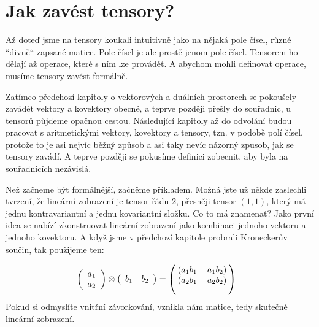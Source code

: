 \documentclass[a5paper,12pt]{amsbook}
\theoremstyle{definition}
\begin{document}
\section{Jak zavést tensory?}

\noindent
Až doteď jsme na tensory koukali intuitivně jako na nějaká pole čísel, různé ``divně`` zapsané matice.
Pole čísel je ale prostě jenom pole čísel. Tensorem ho dělají až operace, které s ním lze provádět.
A abychom mohli definovat operace, musíme tensory zavést formálně.

Zatímco předchozí kapitoly o vektorových a duálních prostorech se pokoušely zavádět vektory
a kovektory obecně, a teprve později přešly do souřadnic, u tensorů půjdeme opačnou cestou.
Následující kapitoly až do odvolání budou pracovat s aritmetickými vektory, kovektory a tensory,
tzn. v podobě polí čísel, protože to je asi nejvíc běžný způsob a asi taky nevíc názorný zpusob,
jak se tensory zavádí. A teprve později se pokusíme definici zobecnit, aby byla na souřadnicích
nezávislá.

Než začneme být formálnější, začněme příkladem. Možná jste už někde zaslechli tvrzení, že lineární
zobrazení je tensor řádu 2, přesněji tensor $(1,1)$, který má jednu kontravariantní a jednu
kovariantní složku. Co to má znamenat? Jako první idea se nabízí zkonstruovat lineární zobrazení
jako kombinaci jednoho vektoru a jednoho kovektoru. A když jsme v předchozí kapitole probrali
Kroneckerův součin, tak použijeme ten:

\begin{equation*}
\begin{split}
& \left(\begin{array}{c} a_1 \\ a_2\end{array}\right)\otimes\left(\begin{array}{cc}b_1 & b_2\end{array}\right) =
\left(\begin{blockarray}{cc}
\begin{block}{(cc)}
a_1 b_1 & a_1 b_2 \\
\end{block}
\begin{block}{(cc)}
a_2 b_1 & a_2 b_2 \\
\end{block}
\end{blockarray}\right)
\end{split}
\end{equation*}
Pokud si odmyslíte vnitřní závorkování, vznikla nám matice, tedy skutečně lineární zobrazení.
\end{document}

